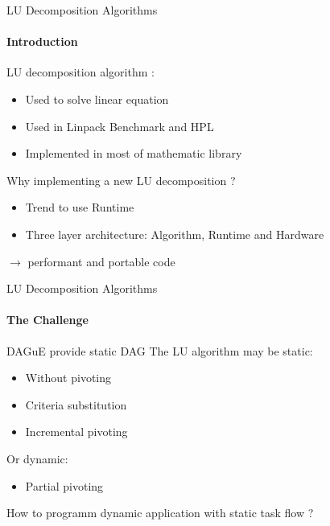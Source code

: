\begin{frame}{LU Decomposition Algorithms}
\framesubtitle{Introduction}
LU decomposition algorithm :
\begin{itemize}
\item Used to solve linear equation
\item Used in Linpack Benchmark and HPL
\item Implemented in most of mathematic library
\end{itemize}
\pause 
\begin{exampleblock}{Why implementing a new LU decomposition ?}
\begin{itemize}
\item Trend to use Runtime
\item Three layer architecture: Algorithm, Runtime and Hardware
\end{itemize}
$\rightarrow$ performant and portable code
\end{exampleblock}{}
\end{frame}

\begin{frame}{LU Decomposition Algorithms}
\framesubtitle{The Challenge}
\begin{exampleblock}{DAGuE provide static DAG}
The LU algorithm may be static:
\begin{itemize}
\item Without pivoting
\item {\color{green}Criteria substitution}
\item {\color{blue}Incremental pivoting}
\end{itemize}
Or dynamic:
\begin{itemize}
\item {\color{green}Partial pivoting}
\end{itemize}
\end{exampleblock}{}
\pause
\alert{How to programm dynamic application with static task flow ?}
\end{frame}
